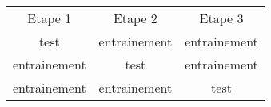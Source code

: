 \begin{center}
\renewcommand{\arraystretch}{3}
\begin{tabular}{c || c || c}
  Etape 1& Etape 2 & Etape 3\\
  \cellcolor{green}test & \cellcolor{red}entrainement & \cellcolor{red}entrainement\\
  \cellcolor{red}entrainement & \cellcolor{green}test & \cellcolor{red}entrainement\\
  \cellcolor{red}entrainement & \cellcolor{red}entrainement & \cellcolor{green}test\\
\end{tabular}
\end{center}

